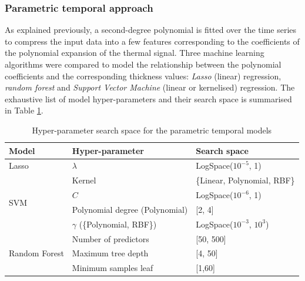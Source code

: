 \subsubsection{Parametric temporal approach}

As explained previously, a second-degree polynomial is fitted over the time series to compress the input data into a few features corresponding to the coefficients of the polynomial expansion of the thermal signal. Three machine learning algorithms were compared to model the relationship between the polynomial coefficients and the corresponding thickness values: \textit{Lasso} (linear) regression, \textit{random forest} and \textit{Support Vector Machine} (linear or kernelised) regression. 
The exhaustive list of model hyper-parameters and their search space is summarised in Table \ref{tab:Parametric Temporal_search_space}.

\begin{table}
\centering
\caption{Hyper-parameter search space for the parametric temporal models}
\label{tab:Parametric Temporal_search_space}
\begin{tabular}{@{}l@{~\,}ll@{}} 
\toprule
\textbf{Model}                            & \textbf{Hyper-parameter} & \textbf{Search space}                          \\ 
\midrule
Lasso                                     & $\lambda$                & LogSpace($10^{-5}$, 1)                          \\ 
\midrule
\multirow{4}{*}{SVM}  & Kernel                   & \{Linear, Polynomial, RBF\}  \\ 
\cline{2-3}
                                          & $C$                        & LogSpace($10^{-6}$, 1)                          \\ 
\cline{2-3}
                                          & Polynomial degree (Polynomial) & [2, 4] \\
\cline{2-3}
                                          & $\gamma$ (\{Polynomial, RBF\}) & LogSpace($10^{-3}$, $10^{3}$) \\
                                          
\midrule
\multirow{3}{*}{Random Forest}  & Number of predictors     & [50, 500]                       \\ 
\cline{2-3}
                                          & Maximum tree depth       & [4, 50]                           \\ 
\cline{2-3}
                                          & Minimum samples leaf     & [1,60]                           \\
\bottomrule
\end{tabular}
\end{table}

